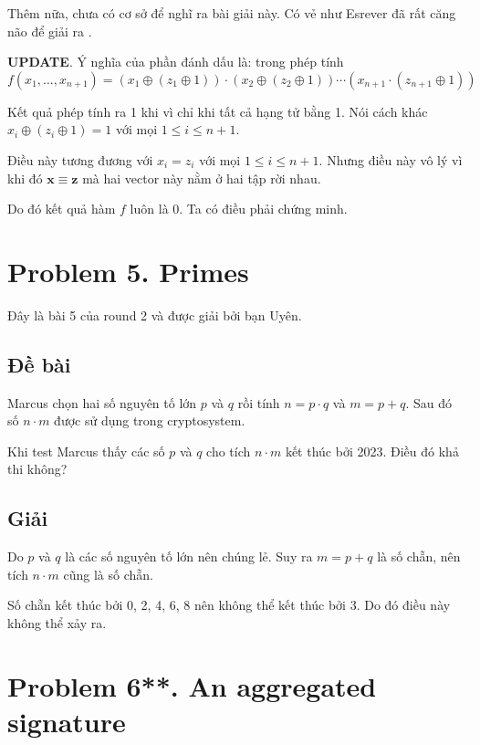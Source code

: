 Thêm nữa, chưa có cơ sở để nghĩ ra bài giải này. Có vẻ như Esrever đã rất căng não để giải ra .

\textbf{UPDATE}. Ý nghĩa của phần đánh dấu là: trong phép tính
\begin{equation*}
    f(x_1, \ldots, x_{n+1}) = (x_1 \oplus (z_1 \oplus 1)) \cdot (x_2 \oplus (z_2 \oplus 1)) \cdots (x_{n+1} \cdot (z_{n+1} \oplus 1))
\end{equation*}

Kết quả phép tính ra 1 khi vì chỉ khi tất cả hạng tử bằng 1. Nói cách khác $x_i \oplus (z_i \oplus 1) = 1$ với mọi $1 \leqslant i \leqslant n+1$.

Điều này tương đương với $x_i = z_i$ với mọi $1 \leqslant i \leqslant n+1$. Nhưng điều này vô lý vì khi đó $\bm{x} \equiv \bm{z}$ mà hai vector này nằm ở hai tập rời nhau.

Do đó kết quả hàm $f$ luôn là 0. Ta có điều phải chứng minh.

\section*{Problem 5. Primes}

Đây là bài 5 của round 2 và được giải bởi bạn Uyên.

\subsection*{Đề bài}

Marcus chọn hai số nguyên tố lớn $p$ và $q$ rồi tính $n = p \cdot q$ và $m = p + q$. Sau đó số $n \cdot m$ được sử dụng trong cryptosystem.

Khi test Marcus thấy các số $p$ và $q$ cho tích $n \cdot m$ kết thúc bởi 2023. Điều đó khả thi không?

\subsection*{Giải}

Do $p$ và $q$ là các số nguyên tố lớn nên chúng lẻ. Suy ra $m = p + q$ là số chẵn, nên tích $n \cdot m$ cũng là số chẵn.

Số chẵn kết thúc bởi 0, 2, 4, 6, 8 nên không thể kết thúc bởi 3. Do đó điều này không thể xảy ra.

\section*{Problem 6**. An aggregated signature}

